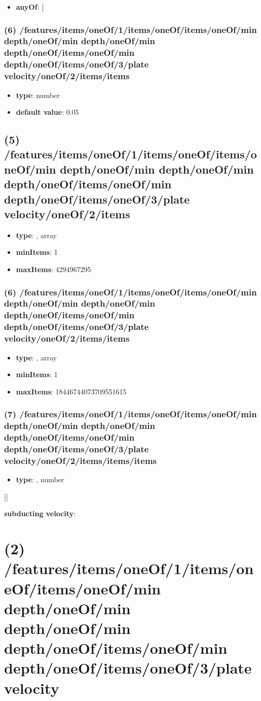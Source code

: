 \begin{itemize}[leftmargin=6em]\item {\bf anyOf}: [\end{itemize}\subsubsection{(6) /features/items/oneOf/1/items/oneOf/items/oneOf/min depth/oneOf/min depth/oneOf/min depth/oneOf/items/oneOf/min depth/oneOf/items/oneOf/3/plate velocity/oneOf/2/items/items}
\begin{itemize}[leftmargin=6em]\item {\bf type}: number\item {\bf default value}: 0.05
\end{itemize}\subsection{(5) /features/items/oneOf/1/items/oneOf/items/oneOf/min depth/oneOf/min depth/oneOf/min depth/oneOf/items/oneOf/min depth/oneOf/items/oneOf/3/plate velocity/oneOf/2/items}
\begin{itemize}[leftmargin=5em]\item {\bf type}: , array\item {\bf minItems}: 1
\item {\bf maxItems}: 4294967295
\end{itemize}\subsubsection{(6) /features/items/oneOf/1/items/oneOf/items/oneOf/min depth/oneOf/min depth/oneOf/min depth/oneOf/items/oneOf/min depth/oneOf/items/oneOf/3/plate velocity/oneOf/2/items/items}
\begin{itemize}[leftmargin=6em]\item {\bf type}: , array\item {\bf minItems}: 1
\item {\bf maxItems}: 18446744073709551615
\end{itemize}\subsubsection{(7) /features/items/oneOf/1/items/oneOf/items/oneOf/min depth/oneOf/min depth/oneOf/min depth/oneOf/items/oneOf/min depth/oneOf/items/oneOf/3/plate velocity/oneOf/2/items/items/items}
\begin{itemize}[leftmargin=7em]\item {\bf type}: , number\end{itemize}]]\item {\bf subducting velocity}: \section{(2) /features/items/oneOf/1/items/oneOf/items/oneOf/min depth/oneOf/min depth/oneOf/min depth/oneOf/items/oneOf/min depth/oneOf/items/oneOf/3/plate velocity}
